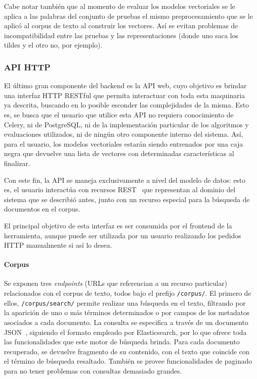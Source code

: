 \quad

Cabe notar también que al momento de evaluar los modelos vectoriales se le aplica a las palabras del
conjunto de pruebas el mismo preprocesamiento que se le aplicó al corpus de texto al construir los
vectores. Así se evitan problemas de incompatibilidad entre las pruebas y las representaciones
(donde uno saca los tildes y el otro no, por ejemplo).


\subsubsection{API HTTP}

El último gran componente del backend es la API web, cuyo objetivo es brindar una interfaz HTTP
RESTful que permita interactuar con toda esta maquinaria ya descrita, buscando en lo posible
esconder las complejidades de la misma. Esto es, se busca que el usuario que utilice esta API no
requiera conocimiento de Celery, ni de PostgreSQL, ni de la implementación particular de los
algoritmos y evaluaciones utilizados, ni de ningún otro componente interno del sistema. Así, para el
usuario, los modelos vectoriales estarán siendo entrenados por una caja negra que devuelve una lista
de vectores con determinadas características al finalizar.

Con este fin, la API se maneja exclusivamente a nivel del modelo de datos: esto es, el usuario
interactúa con recursos REST~\cite{Fielding2000} que representan al dominio del sistema que se
describió antes, junto con un recurso especial para la búsqueda de documentos en el corpus.

El principal objetivo de esta interfaz es ser consumida por el frontend de la herramienta, aunque
puede ser utilizada por un usuario realizando los pedidos HTTP manualmente si así lo desea.


\paragraph{Corpus}

Se exponen tres \textit{endpoints} (URLs que referencian a un recurso particular) relacionados con
el corpus de texto, todos bajo el prefijo \texttt{/corpus/}. El primero de ellos,
\texttt{/corpus/search/} permite realizar una búsqueda en el texto, filtrando por la aparición de
uno o más términos determinados o por campos de los metadatos asociados a cada documento. La
consulta se especifica a través de un documento JSON~\cite{JSON}, siguiendo el formato empleado por
Elasticsearch, por lo que ofrece toda las funcionalidades que este motor de búsqueda brinda. Para
cada documento recuperado, se devuelve fragmento de su contenido, con el texto que coincide con el
término de búsqueda resaltado. También se provee funcionalidades de paginado para no tener problemas
con consultas demasiado grandes.

